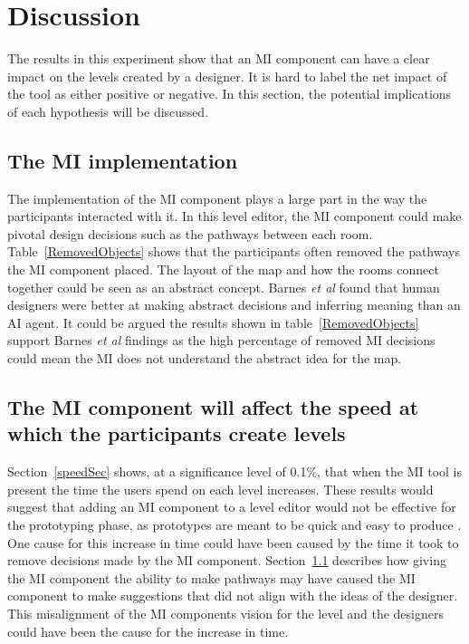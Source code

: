 \documentclass[journal]{IEEEtran}
\begin{document}
\section{Discussion}
The results in this experiment show that an MI component can have a clear impact on the levels created by a designer. It is hard to label the net impact of the tool as either positive or negative. In this section, the potential implications of each hypothesis will be discussed.  

\subsection{The MI implementation}\label{implementation}
 The implementation of the MI component plays a large part in the way the participants interacted with it. In this level editor, the MI component could make pivotal design decisions such as the pathways between each room. Table~\ref{RemovedObjects} shows that the participants often removed the pathways the MI component placed. The layout of the map and how the rooms connect together could be seen as an abstract concept. Barnes \textit{et al}\cite{barnes2015designing} found that human designers were better at making abstract decisions and inferring meaning than an AI agent. It could be argued the results shown in table~\ref{RemovedObjects} support Barnes \textit{et al}\cite{barnes2015designing} findings as the high percentage of removed MI decisions could mean the MI does not understand the abstract idea for the map. 

\subsection{The MI component will affect the speed at which the participants create levels}\label{speedDiss}
Section~\ref{speedSec} shows, at a significance level of 0.1\%, that when the MI tool is present the time the users spend on each level increases. These results would suggest that adding an MI component to a level editor would not be effective for the prototyping phase, as prototypes are meant to be quick and easy to produce \cite{budde1992prototyping}. One cause for this increase in time could have been caused by the time it took to remove decisions made by the MI component. Section~\ref{implementation} describes how giving the MI component the ability to make pathways may have caused the MI component to make suggestions that did not align with the ideas of the designer. This misalignment of the MI components vision for the level and the designers could have been the cause for the increase in time. 
\end{document}
